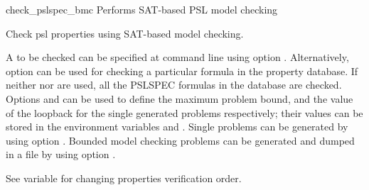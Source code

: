 \begin{nusmvCommand}{check\_pslspec\_bmc} {Performs SAT-based PSL model checking}


Check psl properties using SAT-based model checking.

A \pslexpr to be checked can be specified at command line using option
. Alternatively, option  can be used for checking a
particular formula in the property database. If neither  nor
 are used, all the PSLSPEC formulas in the database are
checked. Options  and  can be used to define the
maximum problem bound, and the value of the loopback for the single generated
problems respectively; their values can be stored in the environment variables
 and . Single problems can be
generated by using option . Bounded model checking problems can
be generated and dumped in a file by using option .

See variable  for changing properties
verification order.

\begin{cmdOpt}






\end{cmdOpt}
\end{nusmvCommand}
